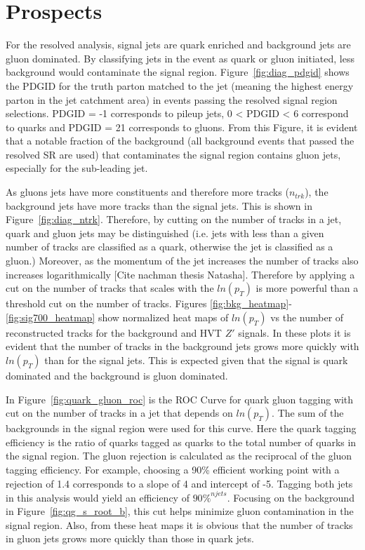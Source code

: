 \label{ch:qg}
\chapter{Prospects}
For the resolved analysis, signal jets are quark enriched and background jets are gluon dominated. By classifying jets in the event as quark or gluon initiated, less background would contaminate the signal region. Figure~\ref{fig:diag_pdgid} shows the PDGID for the truth parton matched to the jet (meaning the highest energy parton in the jet catchment area) in events passing the resolved signal region selections. PDGID = -1 corresponds to pileup jets, 0 < PDGID < 6 correspond to quarks and PDGID = 21 corresponds to gluons. From this Figure, it is evident that a notable fraction of the background (all background events that passed the resolved SR are used) that contaminates the signal region contains gluon jets, especially for the sub-leading jet. 

As gluons jets have more constituents and therefore more tracks ($n_{trk}$), the background jets have more tracks than the signal jets. This is shown in Figure~\ref{fig:diag_ntrk}. Therefore, by cutting on the number of tracks in a jet, quark and gluon jets may be distinguished (i.e. jets with less than a given number of tracks are classified as a quark, otherwise the jet is classified as a gluon.) Moreover, as the momentum of the jet increases the number of tracks also increases logarithmically [Cite nachman thesis Natasha]. Therefore by applying a cut on the number of tracks that scales with the $ln(p_{T})$ is more powerful than a threshold cut on the number of tracks. Figures \ref{fig:bkg_heatmap}-\ref{fig:sig700_heatmap} show normalized heat maps of $ln(p_{T})$ vs the number of reconstructed tracks for the background and HVT $Z'$ signals. In these plots it is evident that the number of tracks in the background jets grows more quickly with $ln(p_{T})$ than for the signal jets. This is expected given that the signal is quark dominated and the background is gluon dominated. 

In Figure~\ref{fig:quark_gluon_roc} is the ROC Curve for quark gluon tagging with cut on the number of tracks in a jet that depends on $ln(p_{T})$. The sum of the backgrounds in the signal region were used for this curve. Here the quark tagging efficiency is the ratio of quarks tagged as quarks to the total number of quarks in the signal region. The gluon rejection is calculated as the reciprocal of the gluon tagging efficiency. For example, choosing a 90\% efficient working point with a rejection of 1.4 corresponds to a slope of 4 and intercept of -5. Tagging both jets in this analysis would yield an efficiency of $90\%^{njets}$. Focusing on the background in Figure~\ref{fig:qg_s_root_b}, this cut helps minimize gluon contamination in the signal region. Also, from these heat maps it is obvious that the number of tracks in gluon jets grows more quickly than those in quark jets.
\pagebreak

